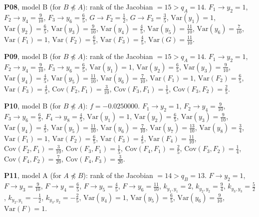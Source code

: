 \documentclass[10pt,a4paper]{article}
\newcommand{\nnest}{\not\preceq}
\begin{document}
{\noindent\textbf{P08}, model B (for $B\nnest A$): rank of the Jacobian $=15>q_A=14$. {\footnotesize $F_{1}\to y_{2}=1$, $F_{2}\to y_{4}=\tfrac{9}{10}$, $F_{3}\to y_{6}=\tfrac{6}{5}$, $G\to F_{2}=\tfrac{1}{2}$, $G\to F_{3}=\tfrac{3}{5}$, $\mathrm{Var}(y_{1})=1$, $\mathrm{Var}(y_{2})=\tfrac{6}{5}$, $\mathrm{Var}(y_{3})=\tfrac{9}{10}$, $\mathrm{Var}(y_{4})=\tfrac{4}{5}$, $\mathrm{Var}(y_{5})=\tfrac{11}{10}$, $\mathrm{Var}(y_{6})=\tfrac{7}{10}$, $\mathrm{Var}(F_{1})=1$, $\mathrm{Var}(F_{2})=\tfrac{6}{5}$, $\mathrm{Var}(F_{3})=\tfrac{4}{5}$, $\mathrm{Var}(G)=\tfrac{11}{10}$.}\par\smallskip
\noindent\textbf{P09}, model B (for $B\nnest A$): rank of the Jacobian $=15>q_A=14$. {\footnotesize $F_{1}\to y_{2}=1$, $F_{2}\to y_{4}=\tfrac{9}{10}$, $F_{3}\to y_{6}=\tfrac{6}{5}$, $\mathrm{Var}(y_{1})=1$, $\mathrm{Var}(y_{2})=\tfrac{6}{5}$, $\mathrm{Var}(y_{3})=\tfrac{9}{10}$, $\mathrm{Var}(y_{4})=\tfrac{4}{5}$, $\mathrm{Var}(y_{5})=\tfrac{11}{10}$, $\mathrm{Var}(y_{6})=\tfrac{7}{10}$, $\mathrm{Var}(F_{1})=1$, $\mathrm{Var}(F_{2})=\tfrac{6}{5}$, $\mathrm{Var}(F_{3})=\tfrac{4}{5}$, $\mathrm{Cov}(F_{2},F_{1})=\tfrac{3}{10}$, $\mathrm{Cov}(F_{3},F_{1})=\tfrac{1}{5}$, $\mathrm{Cov}(F_{3},F_{2})=\tfrac{2}{5}$.}\par\smallskip
\noindent\textbf{P10}, model B (for $B\nnest A$): $f=-0.0250000$. {\footnotesize $F_{1}\to y_{2}=1$, $F_{2}\to y_{4}=\tfrac{9}{10}$, $F_{3}\to y_{6}=\tfrac{6}{5}$, $F_{4}\to y_{8}=\tfrac{4}{5}$, $\mathrm{Var}(y_{1})=1$, $\mathrm{Var}(y_{2})=\tfrac{6}{5}$, $\mathrm{Var}(y_{3})=\tfrac{9}{10}$, $\mathrm{Var}(y_{4})=\tfrac{4}{5}$, $\mathrm{Var}(y_{5})=\tfrac{11}{10}$, $\mathrm{Var}(y_{6})=\tfrac{7}{10}$, $\mathrm{Var}(y_{7})=\tfrac{13}{10}$, $\mathrm{Var}(y_{8})=\tfrac{3}{4}$, $\mathrm{Var}(F_{1})=1$, $\mathrm{Var}(F_{2})=\tfrac{6}{5}$, $\mathrm{Var}(F_{3})=\tfrac{4}{5}$, $\mathrm{Var}(F_{4})=\tfrac{11}{10}$, $\mathrm{Cov}(F_{2},F_{1})=\tfrac{3}{10}$, $\mathrm{Cov}(F_{3},F_{1})=\tfrac{1}{5}$, $\mathrm{Cov}(F_{4},F_{1})=\tfrac{2}{5}$, $\mathrm{Cov}(F_{3},F_{2})=\tfrac{1}{4}$, $\mathrm{Cov}(F_{4},F_{2})=\tfrac{7}{20}$, $\mathrm{Cov}(F_{4},F_{3})=\tfrac{3}{20}$.}\par\smallskip
\noindent\textbf{P11}, model A (for $A\nnest B$): rank of the Jacobian $=14>q_B=13$. {\footnotesize $F\to y_{2}=1$, $F\to y_{3}=\tfrac{9}{10}$, $F\to y_{4}=\tfrac{6}{5}$, $F\to y_{5}=\tfrac{4}{5}$, $F\to y_{6}=\tfrac{11}{10}$, $k_{y_{1},y_{1}}=2$, $k_{y_{2},y_{2}}=\tfrac{9}{4}$, $k_{y_{3},y_{3}}=\tfrac{5}{2}$, $k_{y_{2},y_{1}}=-\tfrac{1}{2}$, $k_{y_{3},y_{2}}=-\tfrac{2}{5}$, $\mathrm{Var}(y_{4})=1$, $\mathrm{Var}(y_{5})=\tfrac{6}{5}$, $\mathrm{Var}(y_{6})=\tfrac{9}{10}$, $\mathrm{Var}(F)=1$.}\par\smallskip
}
\end{document}
